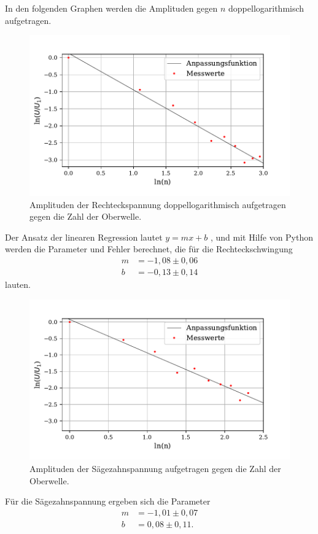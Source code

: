\noindent In den folgenden Graphen werden die Amplituden gegen $n$ doppellogarithmisch aufgetragen.

\begin{figure}[H]
  \centering
  \includegraphics{plot1.pdf}
  \caption{Amplituden der Rechteckspannung doppellogarithmisch aufgetragen gegen die Zahl der Oberwelle.}
  \label{fig:rechteck}
\end{figure}
\noindent Der Ansatz der linearen Regression lautet $y = mx + b$ , und mit Hilfe von Python werden die Parameter und Fehler berechnet, die für die Rechteckschwingung
\begin{align*}
  m &= -1,08 \pm 0,06 \\
  b &= -0,13 \pm 0,14 
\end{align*}
lauten.

\begin{figure}[H]
  \centering
  \includegraphics{plot2.pdf}
  \caption{Amplituden der Sägezahnspannung aufgetragen gegen die Zahl der Oberwelle.}
  \label{fig:rechteck}
\end{figure}
Für die Sägezahnspannung ergeben sich die Parameter
\begin{align*}
  m &= -1,01 \pm 0,07 \\
  b &= 0,08 \pm 0,11 .
\end{align*}

